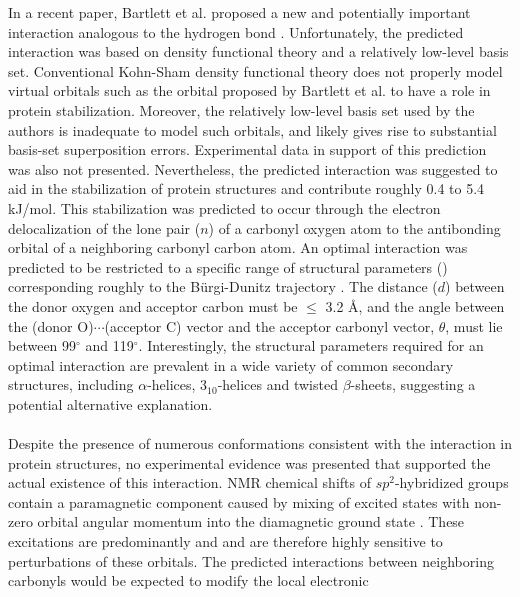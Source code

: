 \begin{doublespace}
In a recent paper, Bartlett et al. proposed a new and potentially
important interaction analogous to the hydrogen bond
\cite{bartlett:ncb2010}. Unfortunately, the predicted \npistar{}
interaction was based on density functional theory and a relatively low-level
basis set. Conventional Kohn-Sham density functional theory does not properly
model virtual orbitals  \cite{mera:physrev2009} such as the \pistar{}
orbital proposed by Bartlett et al. to have a role in protein stabilization.
Moreover, the relatively low-level basis set used by the authors is inadequate
to model such orbitals, and likely gives rise to substantial basis-set
superposition errors. Experimental data in support of this prediction was also
not presented. Nevertheless, the predicted \npistar{} interaction was suggested
to aid in the stabilization of protein structures and contribute roughly 0.4
to 5.4 kJ/mol. This stabilization was predicted to occur through the electron
delocalization of the lone pair ($n$) of a carbonyl oxygen atom to the
antibonding \pistar{} orbital of a neighboring carbonyl carbon atom. An
optimal \npistar{} interaction was predicted to be restricted to a specific
range of structural parameters () corresponding
roughly to the B\"{u}rgi-Dunitz trajectory \cite{burgi:jacs1973}.
The distance ($d$) between the donor oxygen and acceptor
carbon must be $\leq$ 3.2 \r{A}, and the angle between the
(donor O)$\cdots$(acceptor C) vector and the acceptor carbonyl vector,
$\theta$, must lie between 99$^\circ$ and 119$^\circ$. Interestingly, the
structural parameters required for an optimal \npistar{} interaction are
prevalent in a wide variety of common secondary structures, including
$\alpha$-helices, $3_{10}$-helices and twisted $\beta$-sheets, suggesting
a potential alternative explanation.
\\\\
Despite the presence of numerous conformations consistent with the \npistar{}
interaction in protein structures, no experimental evidence was presented
that supported the actual existence of this interaction. NMR chemical shifts of
$sp^2$-hybridized groups contain a paramagnetic component caused by mixing of
excited states with non-zero orbital angular momentum into the diamagnetic
ground state \cite{ramsey:physrev1950}. These excitations are
predominantly \npistar{} and \pipistar{} and are therefore highly sensitive to
perturbations of these orbitals. The predicted \npistar{} interactions between
neighboring carbonyls would be expected to modify the local electronic

\end{doublespace}
